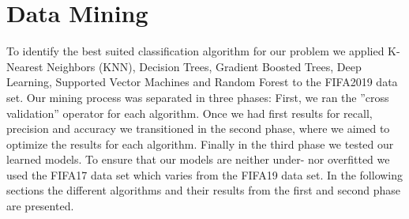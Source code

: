 \documentclass[runningheads]{llncs}
\begin{document}
\section{Data Mining}
\label{sec:DM}
To identify the best suited classification algorithm for our problem we applied K-Nearest Neighbors (KNN), Decision Trees, Gradient Boosted Trees, Deep Learning, Supported Vector Machines and Random Forest to the FIFA2019 data set.
Our mining process was separated in three phases: First, we ran the ''cross validation'' operator for each algorithm. Once we had first results for recall, precision and accuracy we transitioned in the second phase, where we aimed to optimize the results for each algorithm. Finally in the third phase we tested our learned models. To ensure that our models are neither under- nor overfitted we used the FIFA17 data set which varies from the FIFA19 data set.
In the following sections the different algorithms and their results from the first and second phase are presented.












\newpage
%
%
\end{document}
